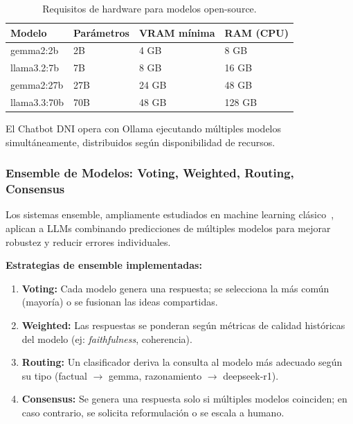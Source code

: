 \begin{table}[H]
\centering
\caption{Requisitos de hardware para modelos open-source.}
\label{tab:hardware-models}
\begin{tabular}{@{}llll@{}}
\toprule
\textbf{Modelo} & \textbf{Par\'ametros} & \textbf{VRAM m\'inima} & \textbf{RAM (CPU)} \\
\midrule
gemma2:2b & 2B & 4 GB & 8 GB \\
llama3.2:7b & 7B & 8 GB & 16 GB \\
gemma2:27b & 27B & 24 GB & 48 GB \\
llama3.3:70b & 70B & 48 GB & 128 GB \\
\bottomrule
\end{tabular}
\end{table}

El Chatbot DNI opera con Ollama ejecutando m\'ultiples modelos simult\'aneamente, distribuidos seg\'un disponibilidad de recursos.

\subsubsection{Ensemble de Modelos: Voting, Weighted, Routing, Consensus}
\label{subsubsec:ensemble}

Los sistemas ensemble, ampliamente estudiados en machine learning cl\'asico~\cite{zhou2012ensemble}, aplican a LLMs combinando predicciones de m\'ultiples modelos para mejorar robustez y reducir errores individuales.

\textbf{Estrategias de ensemble implementadas:}

\begin{enumerate}
    \item \textbf{Voting:} Cada modelo genera una respuesta; se selecciona la m\'as com\'un (mayor\'ia) o se fusionan las ideas compartidas.
    \item \textbf{Weighted:} Las respuestas se ponderan seg\'un m\'etricas de calidad hist\'oricas del modelo (ej: \textit{faithfulness}, coherencia).
    \item \textbf{Routing:} Un clasificador deriva la consulta al modelo m\'as adecuado seg\'un su tipo (factual $\rightarrow$ gemma, razonamiento $\rightarrow$ deepseek-r1).
    \item \textbf{Consensus:} Se genera una respuesta solo si m\'ultiples modelos coinciden; en caso contrario, se solicita reformulaci\'on o se escala a humano.
\end{enumerate}


